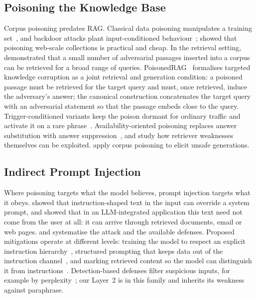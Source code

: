 \documentclass[information,article,submit,moreauthors]{Definitions/mdpi}
\begin{document}
\subsection{Poisoning the Knowledge Base}

Corpus poisoning predates RAG. Classical data poisoning manipulates a training
set~\citep{biggio2012poisoning}, and backdoor attacks plant input-conditioned
behaviour~\citep{gu2017badnets}; \citet{carlini2024poison} showed that poisoning web-scale
collections is practical and cheap. In the retrieval setting, \citet{zhong2023} demonstrated
that a small number of adversarial passages inserted into a corpus can be retrieved for a broad
range of queries. PoisonedRAG~\citep{zou2024} formalises targeted knowledge corruption as a
joint retrieval and generation condition: a poisoned passage must be retrieved for the target
query and must, once retrieved, induce the adversary's answer; the canonical construction
concatenates the target query with an adversarial statement so that the passage embeds close to
the query. Trigger-conditioned variants keep the poison dormant for ordinary traffic and
activate it on a rare phrase~\citep{xue2024badrag,cheng2024trojanrag,chaudhari2024phantom}.
Availability-oriented poisoning replaces answer substitution with answer
suppression~\citep{shafran2024jamming}, and \citet{tan2024glue} study how retriever weaknesses
themselves can be exploited. \citet{deng2024pandora} apply corpus poisoning to elicit unsafe
generations.

\subsection{Indirect Prompt Injection}

Where poisoning targets what the model believes, prompt injection targets what it obeys.
\citet{perez2022ignore} showed that instruction-shaped text in the input can override a system
prompt, and \citet{greshake2023} showed that in an LLM-integrated application this text need
not come from the user at all: it can arrive through retrieved documents, email or web pages.
\citet{liu2023promptinjection} and \citet{liu2024formalizing} systematise the attack and the
available defenses. Proposed mitigations operate at different levels: training the model to
respect an explicit instruction hierarchy~\citep{wallace2024hierarchy}, structured prompting
that keeps data out of the instruction channel~\citep{chen2024struq,chen2025secalign}, and
marking retrieved content so the model can distinguish it from
instructions~\citep{hines2024spotlighting}. Detection-based defenses filter suspicious inputs,
for example by perplexity~\citep{alon2023perplexity,jain2023baseline}; our Layer~2 is in this
family and inherits its weakness against paraphrase.
\end{document}
